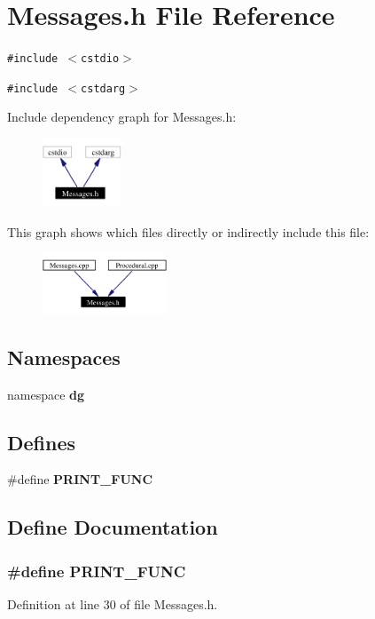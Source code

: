 \section{Messages.h File Reference}
\label{Messages_8h}
{\tt \#include $<$cstdio$>$}\par
{\tt \#include $<$cstdarg$>$}\par


Include dependency graph for Messages.h:\begin{figure}[H]
\begin{center}
\leavevmode
\includegraphics[width=67pt]{Messages_8h__incl}
\end{center}
\end{figure}


This graph shows which files directly or indirectly include this file:\begin{figure}[H]
\begin{center}
\leavevmode
\includegraphics[width=105pt]{Messages_8h__dep__incl}
\end{center}
\end{figure}
\subsection*{Namespaces}
\begin{CompactItemize}
\item 
namespace {\bf dg}
\end{CompactItemize}
\subsection*{Defines}
\begin{CompactItemize}
\item 
\#define {\bf PRINT\_\-FUNC}
\end{CompactItemize}


\subsection{Define Documentation}
\subsubsection{\setlength{\rightskip}{0pt plus 5cm}\#define PRINT\_\-FUNC}\label{Messages_8h_a0}




Definition at line 30 of file Messages.h.